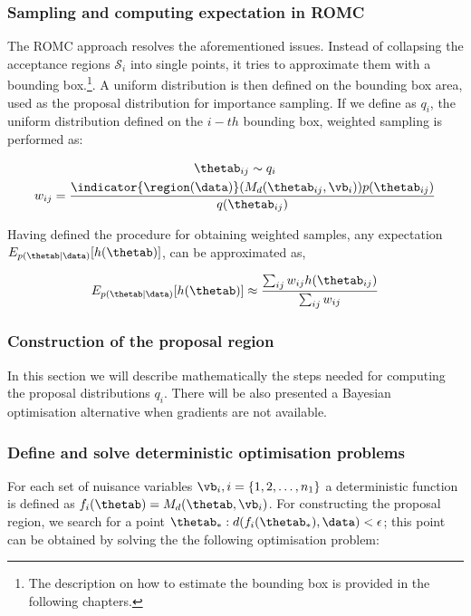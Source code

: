 \subsubsection{Sampling and computing expectation in ROMC}

The ROMC approach resolves the aforementioned issues. Instead of
collapsing the acceptance regions $\mathcal{S}_i$ into single points,
it tries to approximate them with a bounding box.\footnote{The
  description on how to estimate the bounding box is provided in the
  following chapters.}. A uniform distribution is then defined on the
bounding box area, used as the proposal distribution for importance
sampling. If we define as $q_i$, the uniform distribution defined on
the $i-th$ bounding box, weighted sampling is performed as:

\begin{gather}
  \label{eq:sampling}
  \thetab_{ij} \sim q_i \\
  w_{ij} = \frac{\indicator{\region(\data)}(M_d(\thetab_{ij}, \vb_i)) p(\thetab_{ij})}{q(\thetab_{ij})}
\end{gather}

\noindent
Having defined the procedure for obtaining weighted samples, any
expectation $E_{p(\thetab|\data)}[h(\thetab)]$, can be approximated
as,

\begin{equation} \label{eq:expectation}
  E_{p(\thetab|\data)}[h(\thetab)] \approx \frac{\sum_{ij} w_{ij} h(\thetab_{ij})}{\sum_{ij} w_{ij}}
\end{equation}


\subsubsection{Construction of the proposal region}

In this section we will describe mathematically the steps needed for
computing the proposal distributions $q_i$. There will be also
presented a Bayesian optimisation alternative when gradients are not
available.

\subsubsection*{Define and solve deterministic optimisation problems}

For each set of nuisance variables $\vb_i, i = \{1,2,\ldots,n_1 \}$ a
deterministic function is defined as
$f_i(\thetab) = M_d(\thetab,\vb_i)$. For constructing the proposal
region, we search for a point
$\thetab_* : d(f_i(\thetab_*), \data) < \epsilon$; this point can be
obtained by solving the the following optimisation problem:

